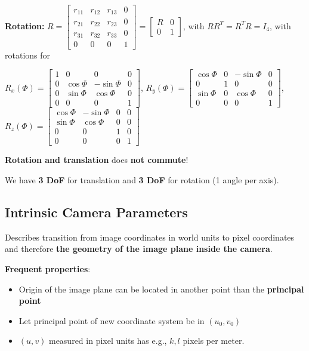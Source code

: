 \textbf{Rotation:} $R = \left[\begin{matrix}
r_{11} & r_{12} & r_{13} & 0 \\ r_{21} & r_{22} & r_{23} & 0 \\ r_{31} & r_{32} & r_{33} & 0 \\ 0 & 0 & 0 & 1
\end{matrix}\right] = \left[\begin{matrix} R & 0 \\ 0 & 1 \end{matrix} \right]$, with $RR^T = R^T R = I_4$, with rotations for

$R_x(\Phi) = \left[\begin{matrix}
1 & 0 & 0 & 0 \\ 0 & \cos \Phi & -\sin \Phi & 0 \\ 0 & \sin \Phi & \cos \Phi & 0 \\ 0 & 0 & 0 & 1
\end{matrix}\right]$, $R_y(\Phi) = \left[\begin{matrix}
\cos \Phi & 0 & -\sin \Phi & 0 \\ 0 & 1 & 0 & 0 \\ \sin \Phi & 0 & \cos \Phi & 0 \\ 0 & 0 & 0 & 1
\end{matrix}\right]$, $R_z(\Phi) = \left[\begin{matrix}
\cos \Phi & -\sin \Phi & 0 & 0 \\ \sin \Phi & \cos \Phi & 0 & 0 \\ 0 & 0 & 1 & 0 \\ 0 & 0 & 0 & 1
\end{matrix}\right]$

\textbf{Rotation and translation} does \textbf{not commute}!

We have \textbf{3 DoF} for translation and \textbf{3 DoF} for rotation (1 angle per axis).

\subsection{Intrinsic Camera Parameters}

Describes transition from image coordinates in world units to pixel coordinates and therefore \textbf{the geometry of the image plane inside the camera}.

\textbf{Frequent properties}: \begin{itemize}
    \item Origin of the image plane can be located in another point than the \textbf{principal point}
    \item Let principal point of new coordinate system be in $(u_0, v_0)$
    \item $(u,v)$ measured in pixel units has e.g., $k,l$ pixels per meter.
\end{itemize}

